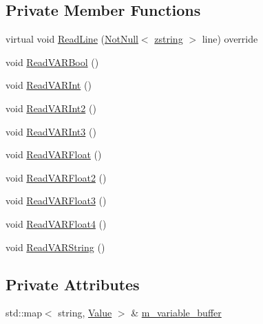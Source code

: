 \subsection*{Private Member Functions}
\begin{DoxyCompactItemize}
\item 
virtual void \hyperlink{classmage_1_1loader_1_1_v_a_r_reader_a511a0778cc515aece781bfdb76024cea}{Read\+Line} (\hyperlink{namespacemage_a8769f9d670d6b585ea306cb1062af94b}{Not\+Null}$<$ \hyperlink{namespacemage_a4163ec9a9a27d5e7f4b452dcb99cb2b9}{zstring} $>$ line) override
\item 
void \hyperlink{classmage_1_1loader_1_1_v_a_r_reader_a2191e47d0806d408145422eb46e32ba1}{Read\+V\+A\+R\+Bool} ()
\item 
void \hyperlink{classmage_1_1loader_1_1_v_a_r_reader_a88a819066140cacd8ce494fca125e1e2}{Read\+V\+A\+R\+Int} ()
\item 
void \hyperlink{classmage_1_1loader_1_1_v_a_r_reader_a4e84ca5a6fabcf2ea29fbf32a5bdf1c4}{Read\+V\+A\+R\+Int2} ()
\item 
void \hyperlink{classmage_1_1loader_1_1_v_a_r_reader_a519dd541a8ee90bc83505d80e5dc1f49}{Read\+V\+A\+R\+Int3} ()
\item 
void \hyperlink{classmage_1_1loader_1_1_v_a_r_reader_a11f2ecdf718d1665a79406e7bebbc6f1}{Read\+V\+A\+R\+Float} ()
\item 
void \hyperlink{classmage_1_1loader_1_1_v_a_r_reader_ac80f8a30ffc67fc6f048cf32dd43c2e8}{Read\+V\+A\+R\+Float2} ()
\item 
void \hyperlink{classmage_1_1loader_1_1_v_a_r_reader_a133ffd4462be737377c0cdb921a90e75}{Read\+V\+A\+R\+Float3} ()
\item 
void \hyperlink{classmage_1_1loader_1_1_v_a_r_reader_a70dfe7e7e0b2fb9a79b6ff4342cc58dc}{Read\+V\+A\+R\+Float4} ()
\item 
void \hyperlink{classmage_1_1loader_1_1_v_a_r_reader_a4ccc6a48ca72707853ff910362318940}{Read\+V\+A\+R\+String} ()
\end{DoxyCompactItemize}
\subsection*{Private Attributes}
\begin{DoxyCompactItemize}
\item 
std\+::map$<$ string, \hyperlink{namespacemage_aa1fe0628487e0706e44efdc62dbdb3a2}{Value} $>$ \& \hyperlink{classmage_1_1loader_1_1_v_a_r_reader_a71291d47ea9f9d679bfd7584447ae6bb}{m\+\_\+variable\+\_\+buffer}
\end{DoxyCompactItemize}


